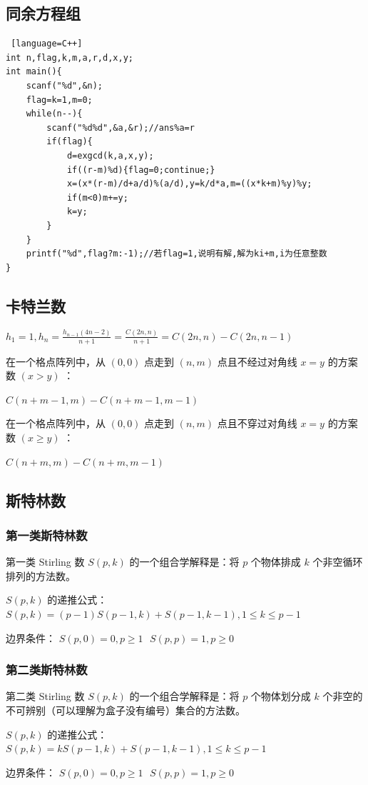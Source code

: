 \documentclass{article}
\begin{document}
\subsection{同余方程组}
\begin{lstlisting} [language=C++]
int n,flag,k,m,a,r,d,x,y;
int main(){
	scanf("%d",&n);
	flag=k=1,m=0;
	while(n--){
		scanf("%d%d",&a,&r);//ans%a=r
		if(flag){
			d=exgcd(k,a,x,y);
			if((r-m)%d){flag=0;continue;}
			x=(x*(r-m)/d+a/d)%(a/d),y=k/d*a,m=((x*k+m)%y)%y;
			if(m<0)m+=y;
			k=y;
		}
	}
	printf("%d",flag?m:-1);//若flag=1,说明有解,解为ki+m,i为任意整数
}
\end{lstlisting}
\subsection{卡特兰数}
$h_1 = 1, h_n = \frac{h_{n-1}(4n-2)}{n+1} = \frac{C(2n, n)}{n+1} = C(2n, n) - C(2n, n-1)$ 

在一个格点阵列中，从 $(0, 0)$ 点走到 $(n, m)$ 点且不经过对角线 $x = y$ 的方案数 $(x > y)$ ： 

$C(n+m-1, m) - C(n+m-1, m-1)$ 

在一个格点阵列中，从 $(0, 0)$ 点走到 $(n, m)$ 点且不穿过对角线 $x = y$ 的方案数 $(x \geq y)$ ： 

 $C(n+m, m) - C(n+m, m-1)$ 
\subsection{斯特林数}
\subsubsection{第一类斯特林数}
第一类 Stirling 数 $S(p, k)$ 的一个组合学解释是：将 $p$ 个物体排成 $k$ 个非空循环排列的方法数。 

$S(p, k)$ 的递推公式： $S(p, k) = (p-1) S(p-1, k) + S(p-1, k-1), 1 \leq k \leq p-1$ 

边界条件： $S(p, 0) = 0, p \geq 1 \text{    } S(p, p) = 1, p \geq 0$
\subsubsection{第二类斯特林数}
第二类 Stirling 数 $S(p, k)$ 的一个组合学解释是：将 $p$ 个物体划分成 $k$ 个非空的不可辨别（可以理解为盒子没有编号）集合的方法数。

$S(p, k)$ 的递推公式： $S(p, k) = k S(p-1, k) + S(p-1, k-1), 1 \leq k \leq p-1$ 

边界条件： $S(p, 0) = 0, p \geq 1 \text{    } S(p, p) = 1, p \geq 0$
\end{document}
